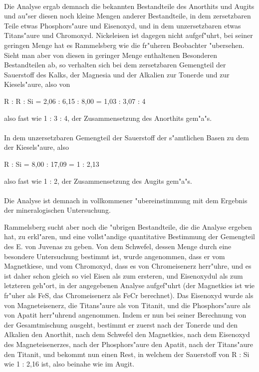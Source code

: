 \documentclass[a4paper, 11pt, oneside]{article}
\begin{document}
\paragraph{}
Die Analyse ergab demnach die bekannten Bestandteile des Anorthits und Augits und au"ser diesen noch kleine Mengen anderer Bestandteile, in dem zersetzbaren Teile etwas Phosphors"aure und Eisenoxyd, und in dem unzersetzbaren etwas Titans"aure und Chromoxyd. Nickeleisen ist dagegen nicht aufgef"uhrt, bei seiner geringen Menge hat es Rammelsberg wie die fr"uheren Beobachter "ubersehen. Sieht man aber von diesen in geringer Menge enthaltenen Besonderen Bestandteilen ab, so verhalten sich bei dem zersetzbaren Gemengteil der Sauerstoff des Kalks, der Magnesia und der Alkalien zur Tonerde und zur Kiesels"aure, also von
\begin{center}
R : R : Si = 2,06 : 6,15 : 8,00 = 1,03 : 3,07 : 4
\end{center}
also fast wie 1 : 3 : 4, der Zusammensetzung des Anorthits gem"a"s.
\paragraph{}
In dem unzersetzbaren Gemengteil der Sauerstoff der s"amtlichen Basen zu dem der Kiesels"aure, also
\begin{center}
R : Si = 8,00 : 17,09 = 1 : 2,13
\end{center}
also fast wie 1 : 2, der Zusammensetzung des Augits gem"a"s.
\paragraph{}
Die Analyse ist demnach in vollkommener "ubereinstimmung mit dem Ergebnis der mineralogischen Untersuchung.

Rammelsberg sucht aber noch die "ubrigen Bestandteile, die die Analyse ergeben hat, zu erkl"aren, und eine vollst"andige quantitative Bestimmung der Gemengteil des E. von Juvenas zu geben. Von dem Schwefel, dessen Menge durch eine besondere Untersuchung bestimmt ist, wurde angenommen, dass er vom Magnetkiese, und vom Chromoxyd, dass es von Chromeisenerz herr"uhre, und es ist daher schon gleich so viel Eisen als zum ersteren, und Eisenoxydul als zum letzteren geh"ort, in der angegebenen Analyse aufgef"uhrt (der Magnetkies ist wie fr"uher als FeS, das Chromeisenerz als FeCr berechnet). Das Eisenoxyd wurde als von Magneteisenerz, die Titans"aure als von Titanit, und die Phosphors"aure als von Apatit herr"uhrend angenommen. Indem er nun bei seiner Berechnung von der Gesamtmischung ausgeht, bestimmt er zuerst nach der Tonerde und den Alkalien den Anorthit, nach dem Schwefel den Magnetkies, nach dem Eisenoxyd des Magneteisenerzes, nach der Phosphors"aure den Apatit, nach der Titans"aure den Titanit, und bekommt nun einen Rest, in welchem der Sauerstoff von R : Si wie 1 : 2,16 ist, also beinahe wie im Augit.
\end{document}
